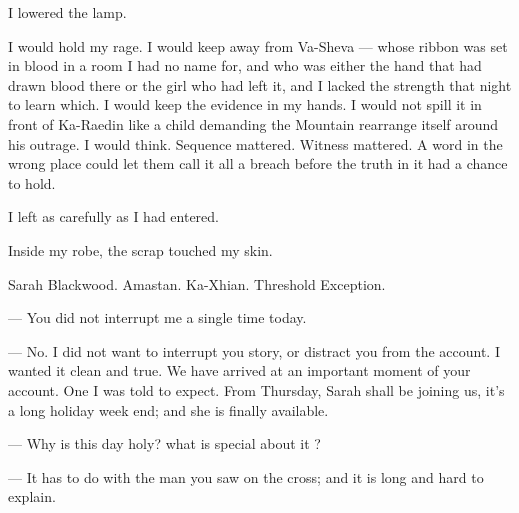 I lowered the lamp.\par

I would hold my rage. I would keep away from Va-Sheva --- whose ribbon was set in blood in a room I had no name for, and who was either the hand that had drawn blood there or the girl who had left it, and I lacked the strength that night to learn which. I would keep the evidence in my hands. I would not spill it in front of Ka-Raedin like a child demanding the Mountain rearrange itself around his outrage. I would think. Sequence mattered. Witness mattered. A word in the wrong place could let them call it all a breach before the truth in it had a chance to hold.\par

I left as carefully as I had entered.

Inside my robe, the scrap touched my skin.\par

Sarah Blackwood. Amastan. Ka-Xhian. Threshold Exception.\par


\begin{room}

--- You did not interrupt me a single time today.

--- No. I did not want to interrupt you story, or distract you from the account. I wanted it clean and true. We have arrived at an important moment of your account. One I was told to expect. From Thursday, Sarah shall be joining us, it's a long holiday week end; and she is finally available.

--- Why is this day holy? what is special about it ?

--- It has to do with the man you saw on the cross; and it is long and hard to explain. 

\end{room}
